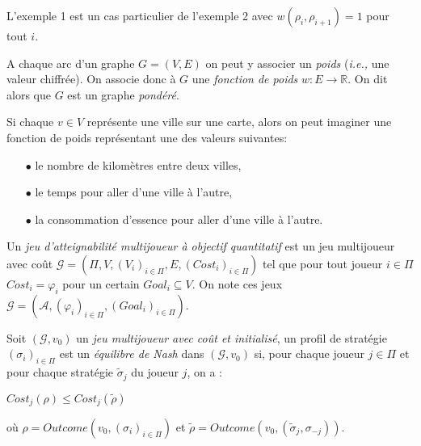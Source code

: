\begin{rem}
	L'exemple 1 est un cas particulier de l'exemple 2 avec $w(\rho_{i},\rho_{i+1}) = 1$ pour tout $i$.
\end{rem}

\begin{defi}
	\label{def:fonctionPoids}
	A chaque arc d'un graphe $G = (V,E)$ on peut y associer un \textit{poids} (\emph{i.e.,} une valeur chiffrée). On associe donc à $G$ une \textit{fonction de poids}  $w : E \rightarrow \mathbb{R}$. On dit alors que $G$ est un graphe \textit{pondéré}.
\end{defi}

\begin{exemple}
	Si chaque $v \in V$ représente une ville sur une carte, alors on peut imaginer une fonction de poids représentant une des valeurs suivantes:
	\begin{enumerate}
		\item [$\bullet$] le nombre de kilomètres entre deux villes,
		\item [$\bullet$] le temps pour aller d'une ville à l'autre,
		\item [$\bullet$] la consommation d'essence pour aller d'une ville à l'autre.
	\end{enumerate}
\end{exemple}



\begin{defi}
	
	Un \textit{jeu d'atteignabilité multijoueur à objectif quantitatif} est un jeu multijoueur avec coût $\mathcal{G} = (\Pi ,V ,(V_{i})_{i \in \Pi} ,E ,(Cost_{i})_{i \in \Pi})$ tel que pour tout joueur $i \in \Pi$ $Cost_{i} = \varphi _{i}$ pour un certain $Goal _{i} \subseteq V$.
	On note ces jeux $\mathcal{G} = (\mathcal{A},(\varphi _{i})_{i\in \Pi},(Goal_{i})_{i \in \Pi})$.
\end{defi}
	










\begin{defi}
	
	Soit $(\mathcal{G}, v_{0})$ un \textit{jeu multijoueur avec coût et initialisé}, un profil de stratégie $(\sigma _{i})_{i \in \Pi}$ est un \textit{équilibre de Nash} dans $(\mathcal{G}, v_{0})$ si, pour chaque joueur $j \in \Pi$ et pour chaque stratégie $\tilde{\sigma}_{j}$ du joueur $j$, on a :
	\begin{center}$ Cost_{j}(\rho) \leq Cost_{j}(\tilde{\rho})$ \end{center}
	où $\rho = Outcome(v_{0},(\sigma _{i})_{i \in \Pi})$ et $\tilde{\rho} = Outcome(v_{0}, (\tilde{\sigma} _{j} ,\sigma _{-j}))$.
\end{defi}	


